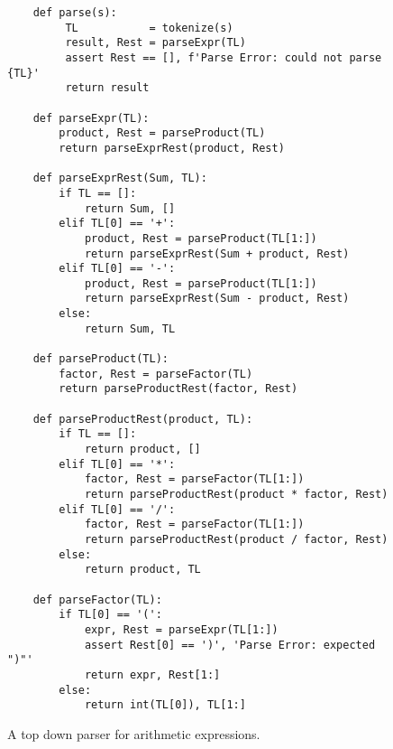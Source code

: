 \begin{figure}[!ht]
\centering
\begin{verbatim}
    def parse(s):
         TL           = tokenize(s)
         result, Rest = parseExpr(TL)
         assert Rest == [], f'Parse Error: could not parse {TL}'
         return result
    
    def parseExpr(TL):
        product, Rest = parseProduct(TL)
        return parseExprRest(product, Rest)
    
    def parseExprRest(Sum, TL):
        if TL == []:
            return Sum, []
        elif TL[0] == '+':
            product, Rest = parseProduct(TL[1:])
            return parseExprRest(Sum + product, Rest)
        elif TL[0] == '-':
            product, Rest = parseProduct(TL[1:])
            return parseExprRest(Sum - product, Rest)
        else:
            return Sum, TL
    
    def parseProduct(TL):
        factor, Rest = parseFactor(TL)
        return parseProductRest(factor, Rest)
    
    def parseProductRest(product, TL):
        if TL == []:
            return product, []
        elif TL[0] == '*': 
            factor, Rest = parseFactor(TL[1:])
            return parseProductRest(product * factor, Rest)
        elif TL[0] == '/':
            factor, Rest = parseFactor(TL[1:])
            return parseProductRest(product / factor, Rest)
        else:
            return product, TL
    
    def parseFactor(TL):
        if TL[0] == '(': 
            expr, Rest = parseExpr(TL[1:])
            assert Rest[0] == ')', 'Parse Error: expected ")"'
            return expr, Rest[1:]
        else: 
            return int(TL[0]), TL[1:]
\end{verbatim}
\vspace*{-0.3cm}
\caption{A top down parser for arithmetic expressions.}
\label{fig:Top-Down-Parser.ipynb}
\end{figure}


